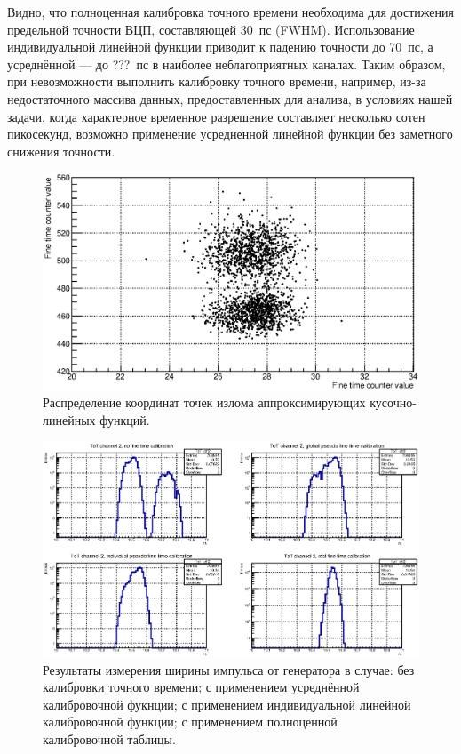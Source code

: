 Видно, что полноценная калибровка точного времени необходима для достижения предельной точности ВЦП, составляющей 30~пс (FWHM). Использование индивидуальной линейной функции приводит к падению точности до 70~пс, а усреднённой --- до ???~пс в наиболее неблагоприятных каналах.
Таким образом, при невозможности выполнить калибровку точного времени, например, из-за недостаточного массива данных, предоставленных для анализа, в условиях нашей задачи, когда характерное временное разрешение составляет несколько сотен пикосекунд, возможно применение усредненной линейной функции без заметного снижения точности.

\begin{figure}
\includegraphics[width=1.0\textwidth]{pictures/ABmap.eps}
\caption{Распределение координат точек излома аппроксимирующих кусочно-линейных функций.}
\label{fig:ABmap}
\end{figure}

\begin{figure}
\includegraphics[width=1.0\textwidth]{pictures/ToT_ch2.eps}
\caption{Результаты измерения ширины импульса от генератора в случае: без калибровки точного времени; с применением усреднённой калибровочной фукнции; с применением индивидуальной линейной калибровочной функции; с применением полноценной калибровочной таблицы.}
\label{fig:FourToT}
\end{figure}

